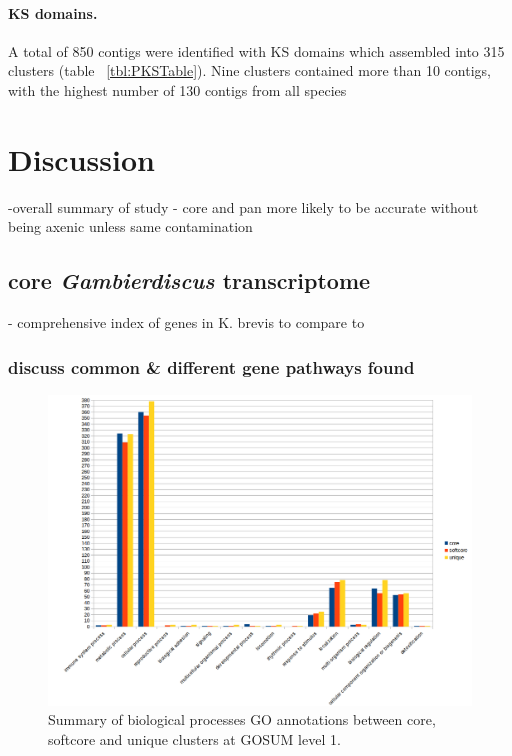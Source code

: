 \documentclass[12pt]{article}
\begin{document}
\paragraph*{KS domains.}
A total of 850 contigs were identified with KS domains which assembled into 315 clusters (table ~\ref{tbl:PKSTable}). 
Nine clusters contained more than 10 contigs, with the highest number of 130 contigs from all species 

\section*{Discussion}
-overall summary of study
- core and pan more likely to be accurate without being axenic unless same contamination

\subsection*{core \textit{Gambierdiscus} transcriptome}
- \cite{lidie2005gene} comprehensive index of genes in K. brevis to compare to 

\subsubsection*{discuss common \& different gene pathways found}
\FloatBarrier
\begin{figure} 
\includegraphics[scale=.58]{3Aug18_cluster-investigation/figures/gosum-pan/Pan-gosum1-bio-graph.png} 
\caption{Summary of biological processes GO annotations between core, softcore and unique clusters at GOSUM level 1.} 
\label{fig:PanGo1Bio}
\end{figure} 
\FloatBarrier
\end{document}
